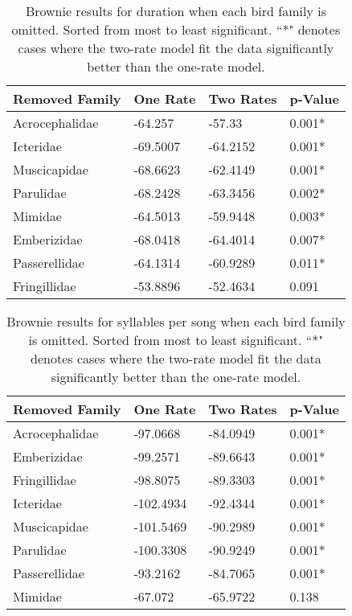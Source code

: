 \documentclass[a4paper,12pt]{article}
\begin{document}
\begin{table}[ht]
\caption{Brownie results for duration when each bird family is omitted.  Sorted from most to least significant.  ``*" denotes cases where the two-rate model fit the data significantly better than the one-rate model.}
\centering
\begin{tabular}{llll}
  \hline
Removed Family & One Rate & Two Rates & p-Value \\ 
  \hline
Acrocephalidae & -64.257 & -57.33 & 0.001* \\ 
  Icteridae & -69.5007 & -64.2152 & 0.001* \\ 
  Muscicapidae & -68.6623 & -62.4149 & 0.001* \\ 
  Parulidae & -68.2428 & -63.3456 & 0.002* \\ 
  Mimidae & -64.5013 & -59.9448 & 0.003* \\ 
  Emberizidae & -68.0418 & -64.4014 & 0.007* \\ 
  Passerellidae & -64.1314 & -60.9289 & 0.011* \\ 
  Fringillidae & -53.8896 & -52.4634 & 0.091 \\ 
   \hline
\end{tabular}
\end{table}
\begin{table}[ht]
\caption{Brownie results for syllables per song when each bird family is omitted.  Sorted from most to least significant.  ``*" denotes cases where the two-rate model fit the data significantly better than the one-rate model.}
\centering
\begin{tabular}{llll}
  \hline
Removed Family & One Rate & Two Rates & p-Value \\ 
  \hline
Acrocephalidae & -97.0668 & -84.0949 & 0.001* \\ 
  Emberizidae & -99.2571 & -89.6643 & 0.001* \\ 
  Fringillidae & -98.8075 & -89.3303 & 0.001* \\ 
  Icteridae & -102.4934 & -92.4344 & 0.001* \\ 
  Muscicapidae & -101.5469 & -90.2989 & 0.001* \\ 
  Parulidae & -100.3308 & -90.9249 & 0.001* \\ 
  Passerellidae & -93.2162 & -84.7065 & 0.001* \\ 
  Mimidae & -67.072 & -65.9722 & 0.138 \\ 
   \hline
\end{tabular}
\end{table}
\end{document}
